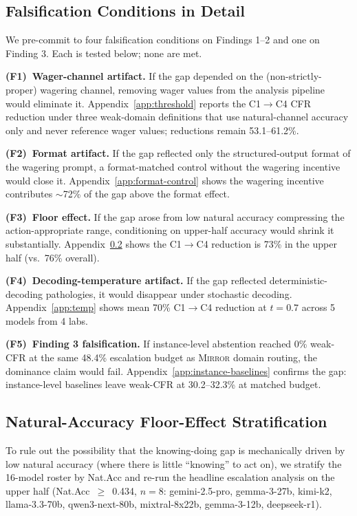 \documentclass[10pt]{article}
\newcommand{\mirror}{\textsc{Mirror}}
\newcommand{\CFR}{CFR}
\begin{document}
\subsection{Falsification Conditions in Detail}
\label{app:falsification-detail}

We pre-commit to four falsification conditions on Findings 1--2 and one on Finding 3. Each is tested below; none are met.

\textbf{(F1)~Wager-channel artifact.} If the gap depended on the (non-strictly-proper) wagering channel, removing wager values from the analysis pipeline would eliminate it. Appendix~\ref{app:threshold} reports the C1$\to$C4 \CFR{} reduction under three weak-domain definitions that use natural-channel accuracy only and never reference wager values; reductions remain 53.1--61.2\%.

\textbf{(F2)~Format artifact.} If the gap reflected only the structured-output format of the wagering prompt, a format-matched control without the wagering incentive would close it. Appendix~\ref{app:format-control} shows the wagering incentive contributes ${\sim}$72\% of the gap above the format effect.

\textbf{(F3)~Floor effect.} If the gap arose from low natural accuracy compressing the action-appropriate range, conditioning on upper-half accuracy would shrink it substantially. Appendix~\ref{app:floor-effect} shows the C1$\to$C4 reduction is 73\% in the upper half (vs.\ 76\% overall).

\textbf{(F4)~Decoding-temperature artifact.} If the gap reflected deterministic-decoding pathologies, it would disappear under stochastic decoding. Appendix~\ref{app:temp} shows mean 70\% C1$\to$C4 reduction at $t\!=\!0.7$ across 5 models from 4 labs.

\textbf{(F5)~Finding 3 falsification.} If instance-level abstention reached 0\% weak-\CFR{} at the same 48.4\% escalation budget as \mirror{} domain routing, the dominance claim would fail. Appendix~\ref{app:instance-baselines} confirms the gap: instance-level baselines leave weak-\CFR{} at 30.2--32.3\% at matched budget.

\subsection{Natural-Accuracy Floor-Effect Stratification}
\label{app:floor-effect}

To rule out the possibility that the knowing-doing gap is mechanically driven by low natural accuracy (where there is little ``knowing'' to act on), we stratify the 16-model roster by Nat.Acc and re-run the headline escalation analysis on the upper half (Nat.Acc~$\geq$~0.434, $n=8$: gemini-2.5-pro, gemma-3-27b, kimi-k2, llama-3.3-70b, qwen3-next-80b, mixtral-8x22b, gemma-3-12b, deepseek-r1).
\end{document}
